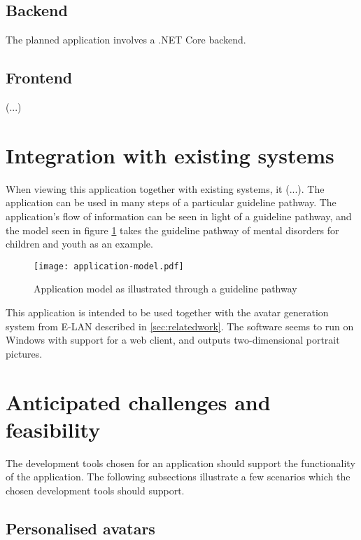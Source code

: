 \subsection{Backend}

The planned application involves a .NET Core backend.

\subsection{Frontend}

(...)

\section{Integration with existing systems}

When viewing this application together with existing systems, it (...). The application can be used in many steps of a particular guideline pathway. The application's flow of information can be seen in light of a guideline pathway, and the model seen in figure \ref{fig:applicationmodel} takes the guideline pathway of mental disorders for children and youth \autocite{haugland2018} as an example.

\begin{figure}
    \centering
    \texttt{[image: application-model.pdf]}
    \caption{Application model as illustrated through a guideline pathway}
    \label{fig:applicationmodel}
\end{figure}

This application is intended to be used together with the avatar generation system from E-LAN described in \cref{sec:relatedwork}.
The software seems to run on Windows with support for a web client, and outputs two-dimensional portrait pictures.

\section{Anticipated challenges and feasibility}
\label{sec:anticipatedchallenges}

The development tools chosen for an application should support the functionality of the application. The following subsections illustrate a few scenarios which the chosen development tools should support.

\subsection{Personalised avatars}

